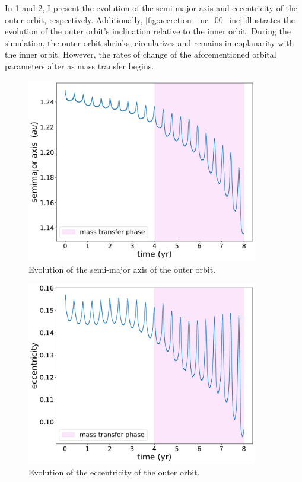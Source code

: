 In \cref{fig:accretion_inc_00_outer_semimajor_axis} and \cref{fig:accretion_inc_00_outer_ecc}, I present the evolution of the semi-major axis and eccentricity of the outer orbit, respectively. Additionally, \cref{fig:accretion_inc_00_inc} illustrates the evolution of the outer orbit's inclination relative to the inner orbit. During the simulation, the outer orbit shrinks, circularizes and remains in coplanarity with the inner orbit. However, the rates of change of the aforementioned orbital parameters alter as mass transfer begins.
\begin{figure}[H]
    \centering
    \includegraphics[width=0.9\textwidth]{Thesis/graphs/inc_00/accretion_outer_inc_00_semimajor_axis.pdf}
    \caption{Evolution of the semi-major axis of the outer orbit.}
    \label{fig:accretion_inc_00_outer_semimajor_axis}
\end{figure}
\newpage
\thispagestyle{empty}
\begin{figure}[H]
\vspace{-2cm}
    \centering
    \includegraphics[width=0.9\textwidth]{Thesis/graphs/inc_00/accretion_inc_00_outer_ecc.pdf}
    \caption{Evolution of the eccentricity of the outer orbit.}
    \label{fig:accretion_inc_00_outer_ecc}
\end{figure}
